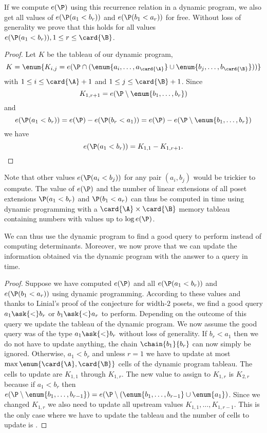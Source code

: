 If we compute \(e(\P)\) using this recurrence relation in a dynamic program,
we also get all values of \(e(\P(a_1 < b_r))\) and \(e(\P(b_1 < a_r))\) for
free. Without loss of generality we prove that this holds for all
values \(e(\P(a_1 < b_r)), 1 \le r \le \card{\B}\).
\begin{proof}
Let \(K\) be the tableau of our dynamic program, \ie
\begin{displaymath}
K = \enum{K_{i,j} = e(\P \cap (\enum{a_i,\ldots,a_{\card{\A}}} \cup
\enum{b_j,\ldots,b_{\card{\B}}}))}
\end{displaymath}
with \(1 \le i \le \card{\A}+1\) and \(1 \le j \le \card{\B}+1\). Since
\begin{displaymath}
K_{1,r+1} = e(\P \setminus \enum{b_1,\ldots,b_r})
\end{displaymath}
and
\begin{displaymath}
e(\P(a_1 < b_r)) = e(\P) - e(\P(b_r < a_1)) = e(\P) - e(\P \setminus \enum{b_1,\ldots,b_r})
\end{displaymath}
we have
\begin{displaymath}
e(\P(a_1 < b_r)) = K_{1,1} - K_{1,r+1}.
\end{displaymath}
\end{proof}
Note that other values \(e(\P(a_i < b_j))\) for any pair \((a_i,b_j)\)
would be trickier to compute. The value of \(e(\P)\) and the number of linear
extensions of all poset extensions \(\P(a_1 < b_r)\) and \(\P(b_1 < a_r)\) can
thus be computed in  time using dynamic programming with a
\(\card{\A} \times \card{\B}\) memory tableau containing numbers with values up to \(\log
e(\P)\).

We can thus use the dynamic program to find a good query to perform instead of
computing determinants.
Moreover, we now prove that we can update the information obtained via the dynamic program
with the answer to a query in  time.
\begin{proof}
Suppose we have computed \(e(\P)\) and all \(e(\P(a_1 < b_r))\) and
\(e(\P(b_1 < a_r))\) using dynamic programming. According to these values and
thanks to Linial's proof of the \onethirdtwothird conjecture for width-\(2\)
posets, we find a good query \(a_1 \ask{<} b_r\) or \(b_1 \ask{<} a_r\) to perform.
Depending on the outcome of this query we update the tableau of the dynamic
program. We now assume the good query was of the type \(a_1 \ask{<} b_r\)
without loss of generality. If \(b_r < a_1\) then we do not have to update anything,
the chain \(\chain{b_1}{b_r}\) can now simply be ignored. Otherwise, \(a_1 <
b_r\) and
unless \(r = 1\) we have to update at most \(\max\enum{\card{\A}, \card{\B}}\) cells of the dynamic program
tableau. The
cells to update are \(K_{1,1}\) through \(K_{1,r}\). The
new value to assign to \(K_{1,r}\) is \(K_{2,r}\) because if \(a_1 < b_r\)
then \(e(\P \setminus
\enum{b_1,\ldots,b_{r-1}}) = e(\P \setminus (\enum{b_1,\ldots,b_{r-1}} \cup
\enum{a_1})\). Since we changed \(K_{1,r}\) we also need to update all upstream
values \(K_{1,1}, \ldots, K_{1,r-1}\). This is the only case where we have to
update the tableau and the number of cells to update is .
\end{proof}

